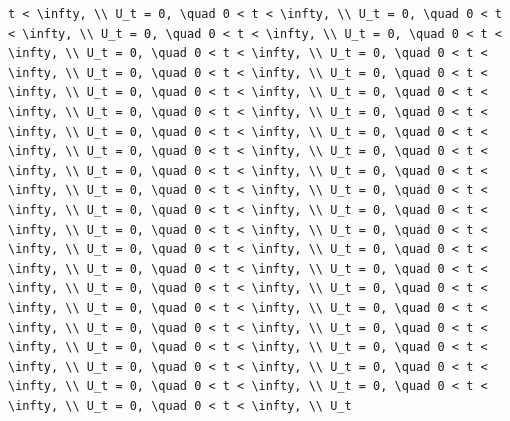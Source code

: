 \documentclass[
  ukrainian,
]{article}
\begin{document}
\begin{verbatim}
t < \infty, \\ U_t = 0, \quad 0 < t < \infty, \\ U_t = 0, \quad 0 < t < \infty, \\ U_t = 0, \quad 0 < t < \infty, \\ U_t = 0, \quad 0 < t < \infty, \\ U_t = 0, \quad 0 < t < \infty, \\ U_t = 0, \quad 0 < t < \infty, \\ U_t = 0, \quad 0 < t < \infty, \\ U_t = 0, \quad 0 < t < \infty, \\ U_t = 0, \quad 0 < t < \infty, \\ U_t = 0, \quad 0 < t < \infty, \\ U_t = 0, \quad 0 < t < \infty, \\ U_t = 0, \quad 0 < t < \infty, \\ U_t = 0, \quad 0 < t < \infty, \\ U_t = 0, \quad 0 < t < \infty, \\ U_t = 0, \quad 0 < t < \infty, \\ U_t = 0, \quad 0 < t < \infty, \\ U_t = 0, \quad 0 < t < \infty, \\ U_t = 0, \quad 0 < t < \infty, \\ U_t = 0, \quad 0 < t < \infty, \\ U_t = 0, \quad 0 < t < \infty, \\ U_t = 0, \quad 0 < t < \infty, \\ U_t = 0, \quad 0 < t < \infty, \\ U_t = 0, \quad 0 < t < \infty, \\ U_t = 0, \quad 0 < t < \infty, \\ U_t = 0, \quad 0 < t < \infty, \\ U_t = 0, \quad 0 < t < \infty, \\ U_t = 0, \quad 0 < t < \infty, \\ U_t = 0, \quad 0 < t < \infty, \\ U_t = 0, \quad 0 < t < \infty, \\ U_t = 0, \quad 0 < t < \infty, \\ U_t = 0, \quad 0 < t < \infty, \\ U_t = 0, \quad 0 < t < \infty, \\ U_t = 0, \quad 0 < t < \infty, \\ U_t = 0, \quad 0 < t < \infty, \\ U_t = 0, \quad 0 < t < \infty, \\ U_t = 0, \quad 0 < t < \infty, \\ U_t = 0, \quad 0 < t < \infty, \\ U_t = 0, \quad 0 < t < \infty, \\ U_t = 0, \quad 0 < t < \infty, \\ U_t = 0, \quad 0 < t < \infty, \\ U_t = 0, \quad 0 < t < \infty, \\ U_t


\end{verbatim}
\end{document}
